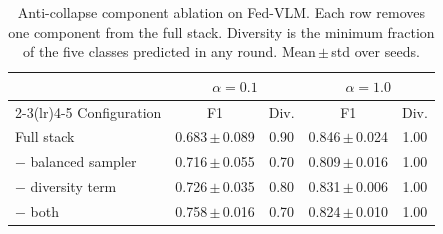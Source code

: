 \begin{table}[t]
\caption{Anti-collapse component ablation on Fed-VLM. Each row removes one
component from the full stack. Diversity is the minimum fraction of the five
classes predicted in any round. Mean\,$\pm$\,std over seeds.}
\label{tab:anticollapse}
\centering\footnotesize
\setlength\tabcolsep{4pt}
\begin{tabular}{lcccc}
\toprule
 & \multicolumn{2}{c}{$\alpha=0.1$} & \multicolumn{2}{c}{$\alpha=1.0$}\\
\cmidrule(lr){2-3}\cmidrule(lr){4-5}
Configuration & F1 & Div. & F1 & Div.\\
\midrule
Full stack & 0.683\,$\pm$\,0.089 & 0.90 & 0.846\,$\pm$\,0.024 & 1.00 \\
$-$ balanced sampler & 0.716\,$\pm$\,0.055 & 0.70 & 0.809\,$\pm$\,0.016 & 1.00 \\
$-$ diversity term & 0.726\,$\pm$\,0.035 & 0.80 & 0.831\,$\pm$\,0.006 & 1.00 \\
$-$ both & 0.758\,$\pm$\,0.016 & 0.70 & 0.824\,$\pm$\,0.010 & 1.00 \\
\bottomrule
\end{tabular}
\end{table}
